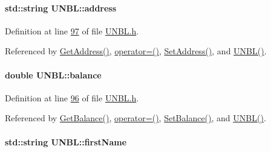 \paragraph[{\texorpdfstring{address}{address}}]{\setlength{\rightskip}{0pt plus 5cm}std\+::string U\+N\+B\+L\+::address\hspace{0.3cm}{\ttfamily [private]}}\hypertarget{class_u_n_b_l_acdaf39211e9b9c190a69bbbc590543e3_acdaf39211e9b9c190a69bbbc590543e3}{}\label{class_u_n_b_l_acdaf39211e9b9c190a69bbbc590543e3_acdaf39211e9b9c190a69bbbc590543e3}


Definition at line \hyperlink{_u_n_b_l_8h_source_l00097}{97} of file \hyperlink{_u_n_b_l_8h_source}{U\+N\+B\+L.\+h}.



Referenced by \hyperlink{_u_n_b_l_8cpp_source_l00062}{Get\+Address()}, \hyperlink{_u_n_b_l_8h_source_l00062}{operator=()}, \hyperlink{_u_n_b_l_8cpp_source_l00058}{Set\+Address()}, and \hyperlink{_u_n_b_l_8h_source_l00024}{U\+N\+B\+L()}.

\paragraph[{\texorpdfstring{balance}{balance}}]{\setlength{\rightskip}{0pt plus 5cm}double U\+N\+B\+L\+::balance\hspace{0.3cm}{\ttfamily [private]}}\hypertarget{class_u_n_b_l_afbe674996d7fddaffb55654e6a79f03b_afbe674996d7fddaffb55654e6a79f03b}{}\label{class_u_n_b_l_afbe674996d7fddaffb55654e6a79f03b_afbe674996d7fddaffb55654e6a79f03b}


Definition at line \hyperlink{_u_n_b_l_8h_source_l00096}{96} of file \hyperlink{_u_n_b_l_8h_source}{U\+N\+B\+L.\+h}.



Referenced by \hyperlink{_u_n_b_l_8cpp_source_l00070}{Get\+Balance()}, \hyperlink{_u_n_b_l_8h_source_l00062}{operator=()}, \hyperlink{_u_n_b_l_8cpp_source_l00066}{Set\+Balance()}, and \hyperlink{_u_n_b_l_8h_source_l00024}{U\+N\+B\+L()}.

\paragraph[{\texorpdfstring{first\+Name}{firstName}}]{\setlength{\rightskip}{0pt plus 5cm}std\+::string U\+N\+B\+L\+::first\+Name\hspace{0.3cm}{\ttfamily [private]}}\hypertarget{class_u_n_b_l_acee1595bf1914ac220f7c810b174bd16_acee1595bf1914ac220f7c810b174bd16}{}\label{class_u_n_b_l_acee1595bf1914ac220f7c810b174bd16_acee1595bf1914ac220f7c810b174bd16}


